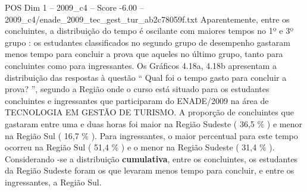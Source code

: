 \begin{textsample}{POS Dim 1 – 2009\_c4 – Score -6.00 – 2009\_c4/enade\_2009\_tec\_gest\_tur\_ab2c78059f.txt}
Aparentemente, entre os concluintes, a distribuição do tempo é oscilante com maiores tempos no 1º e 3º grupo : os estudantes classificados no segundo grupo de desempenho gastaram menos tempo para concluir a prova que aqueles no último grupo, tanto para concluintes como para ingressantes.
Os Gráficos 4.18a, 4.18b apresentam a distribuição das respostas à questão “ Qual foi o tempo gasto para concluir a prova? ”, segundo a Região onde o curso está situado para os estudantes concluintes e ingressantes que participaram do ENADE/2009 na área de TECNOLOGIA EM GESTÃO DE TURISMO.
A proporção de concluintes que gastaram entre uma e duas horas foi maior na Região Sudeste ( 36,5 \% ) e menor na Região Sul ( 16,7 \% ).
Para ingressantes, o maior percentual para este tempo ocorreu na Região Sul ( 51,4 \% ) e o menor na Região Sudeste ( 31,4 \% ).
Considerando -se a distribuição \textbf{cumulativa}, entre os concluintes, os estudantes da Região Sudeste foram os que levaram menos tempo para concluir, e entre os ingressantes, a Região Sul.

\end{textsample}
